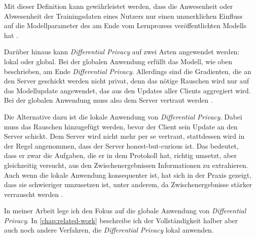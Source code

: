 Mit dieser Definition kann gewährleistet werden, dass die Anwesenheit oder Abwesenheit der Trainingsdaten eines Nutzers nur einen unmerklichen Einfluss auf die Modellparameter des am Ende vom Lernprozess veröffentlichten Modells hat \cite{mcmahan:2018}.

Darüber hinaus kann \textit{Differential Privacy} auf zwei Arten angewendet werden: lokal oder global. Bei der globalen Anwendung erfüllt das Modell, wie oben beschrieben, am Ende \textit{Differential Privacy}. Allerdings sind die Gradienten, die an den Server geschickt werden nicht privat, denn das nötige Rauschen wird nur auf das Modellupdate angewendet, das aus den Updates aller Clients aggregiert wird. Bei der globalen Anwendung muss also dem Server vertraut werden \cite[p.44]{kairouz:2021}.

Die Alternative dazu ist die lokale Anwendung von \textit{Differential Privacy}. Dabei muss das Rauschen hinzugefügt werden, bevor der Client sein Update an den Server schickt. Dem Server wird nicht mehr per se vertraut, stattdessen wird in der Regel angenommen, dass der Server \glqq{}honest-but-curious\grqq{} ist. Das bedeutet, dass er zwar die Aufgaben, die er in dem Protokoll hat, richtig umsetzt, aber gleichzeitig versucht, aus den Zwischenergebnissen Informationen zu extrahieren. Auch wenn die lokale Anwendung konsequenter ist, hat sich in der Praxis gezeigt, dass sie schwieriger umzusetzen ist, unter anderem, da Zwischenergebnisse stärker verrauscht werden \cite[p.54]{kairouz:2021}.

In meiner Arbeit lege ich den Fokus auf die globale Anwendung von \textit{Differential Privacy}. In \autoref{chap:related-work} beschreibe ich der Vollständigkeit halber aber auch noch andere Verfahren, die \textit{Differential Privacy} lokal anwenden.
